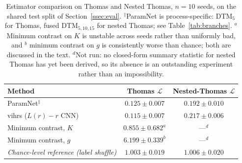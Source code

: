 \documentclass[11pt,a4paper]{article}
\theoremstyle{definitioncolon}
\begin{document}
\begin{table}[tbp]
\centering
\small
\begin{tabular}{lcc}
\toprule
Method & Thomas $\mathcal{L}$ & Nested-Thomas $\mathcal{L}$ \\
\midrule
ParamNet$^{\ddagger}$    & $0.125 \pm 0.007$ & $0.192 \pm 0.010$ \\
vihrs ($L(r)-r$ CNN)     & $0.115 \pm 0.007$ & $0.217 \pm 0.006$ \\
Minimum contrast, $K$   & $0.855 \pm 0.682^{a}$ & ---$^{d}$ \\
Minimum contrast, $g$   & $6.199 \pm 0.339^{b}$ & ---$^{d}$ \\
\midrule
\emph{Chance-level reference (label shuffle)} & \emph{$1.003 \pm 0.019$} & \emph{$1.006 \pm 0.020$} \\
\bottomrule
\end{tabular}
\caption{Estimator comparison on Thomas and Nested Thomas, $n=10$ seeds, on the shared test split
of Section~\ref{ssec:eval}. $^{\ddagger}$ParamNet is
process-specific: DTM$_5$ for Thomas, fused
DTM$_{5,10,15}$ for nested Thomas; see Table~\ref{tab:branches}.
$^a$ Minimum contrast on
$K$ is unstable across seeds rather than uniformly bad, and $^b$ minimum
contrast on $g$ is consistently worse than chance; both are discussed in
the text. $^{d}$Not run: no closed-form summary statistic for nested Thomas
has yet been derived, so its absence is an outstanding experiment rather
than an impossibility.}
\label{tab:classical-comparison}
\end{table}
\end{document}
